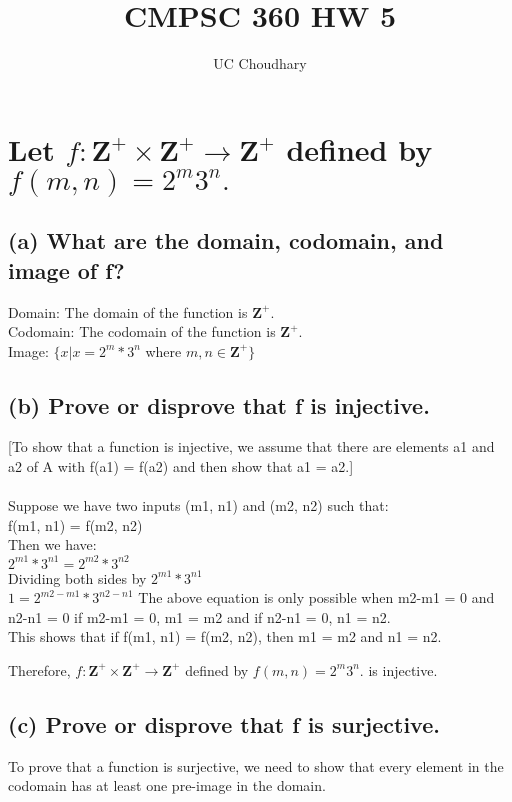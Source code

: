 \documentclass{article}
\title{CMPSC 360 HW 5}
\author{UC Choudhary}
\begin{document}
\date{}
\maketitle


\section{Let $f: \mathbf{Z^+} \times \mathbf{Z^+} \rightarrow \mathbf{Z^+}$ defined by $f(m,n) = 2^m3^n.$}
\subsection{(a) What are the domain, codomain, and image of f?}
\Large Domain: The domain of the function is $\mathbf{Z^+}$.\\
\Large Codomain: The codomain of the function is $\mathbf{Z^+}$.\\
\Large Image: $\{x|x = 2^m*3^n$ where $m,n \in \mathbf{Z^+}\}$
\\
\subsection{(b) Prove or disprove that f is injective.}
[To show that a function is injective, we assume that there are elements a1 and a2 of
A with f(a1) = f(a2) and then show that a1 = a2.]\\
\\
Suppose we have two inputs (m1, n1) and (m2, n2) such that:\\
f(m1, n1) = f(m2, n2)\\
Then we have:\\
$2^{m1}*3^{n1} = 2^{m2}*3^{n2}$\\
Dividing both sides by $2^{m1}*3^{n1}$\\
$1 = 2^{m2-m1}*3^{n2-n1}$
The above equation is only possible when m2-m1 = 0 and n2-n1 = 0
if m2-m1 = 0, m1 = m2 and if n2-n1 = 0, n1 = n2.\\

This shows that if f(m1, n1) = f(m2, n2), then m1 = m2 and n1 = n2.

Therefore, $f: \mathbf{Z^+} \times \mathbf{Z^+} \rightarrow \mathbf{Z^+}$ defined by $f(m,n) = 2^m3^n.$ is injective.

\subsection{(c) Prove or disprove that f is surjective.}
\Large To prove that a function is surjective, we need to show that every element in the codomain has at least one pre-image in the domain.\\
\end{document}
